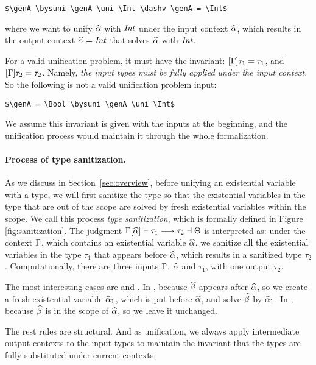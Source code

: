 \begin{lstlisting}
$\genA \bysuni \genA \uni \Int \dashv \genA = \Int$
\end{lstlisting}

\noindent where we want to unify $\widehat{\alpha}$ with $\mathit{Int}$ under the input context
$\widehat{\alpha}$, which results in the output context $\widehat{\alpha} = \mathit{Int}$ that solves $\widehat{\alpha}$
with $\mathit{Int}$.

For a valid unification problem, it must have the invariant: $[\Gamma] \tau_1 =
\tau_1$, and $[\Gamma] \tau_2 = \tau_2$. Namely,
\textit{the input types must be
fully applied under the input context}.
 So the following is not a valid
unification problem input:

\begin{lstlisting}
$\genA = \Bool \bysuni \genA \uni \Int$
\end{lstlisting}

We assume this invariant is given with the inputs at the beginning,
and the unification process would maintain it through the whole
formalization.

\paragraph{Process of type sanitization.}

As we discuss in Section~\ref{sec:overview}, before unifying an existential
variable with a type, we will first sanitize the type so that the existential
variables in the type that are out of the scope are solved by fresh existential
variables within the scope. We call this process \textit{type sanitization},
which is formally defined in Figure \ref{fig:sanitization}. The judgment
$\Gamma[\widehat{\alpha}] \vdash \tau_1 \longrightarrow \tau_2 \dashv \Theta$ is interpreted as: under the
context $\Gamma$, which contains an existential variable $\widehat{\alpha}$, we sanitize all
the existential variables in the type $\tau_1$ that appears before $\widehat{\alpha}$,
which results in a sanitized type $\tau_2$. Computationally, there are three
inputs $\Gamma$, $\widehat{\alpha}$ and $\tau_1$, with one output $\tau_2$.

The most interesting cases are  and . In
, because $\widehat{\beta}$ appears after $\widehat{\alpha}$, so we create a fresh
existential variable $\widehat{\alpha}_1$, which is put before $\widehat{\alpha}$, and solve $\widehat{\beta}$
by $\widehat{\alpha}_1$. In , because $\widehat{\beta}$ is in the scope of $\widehat{\alpha}$,
so we leave it unchanged.

The rest rules are structural.
And as unification, we always apply intermediate output
contexts to the input types to maintain the invariant that the types are fully
substituted under current contexts.

